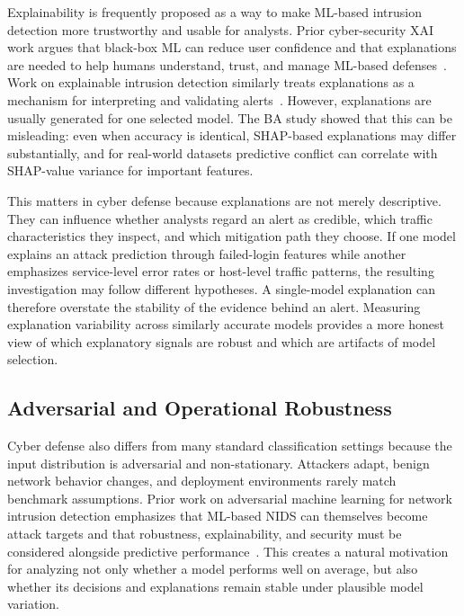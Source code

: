 Explainability is frequently proposed as a way to make ML-based intrusion detection more trustworthy and usable for analysts. Prior cyber-security XAI work argues that black-box ML can reduce user confidence and that explanations are needed to help humans understand, trust, and manage ML-based defenses~\cite{zhang2022explainable}. Work on explainable intrusion detection similarly treats explanations as a mechanism for interpreting and validating alerts~\cite{szczepanski2020achieving}. However, explanations are usually generated for one selected model. The BA study showed that this can be misleading: even when accuracy is identical, SHAP-based explanations may differ substantially, and for real-world datasets predictive conflict can correlate with SHAP-value variance for important features.

This matters in cyber defense because explanations are not merely descriptive. They can influence whether analysts regard an alert as credible, which traffic characteristics they inspect, and which mitigation path they choose. If one model explains an attack prediction through failed-login features while another emphasizes service-level error rates or host-level traffic patterns, the resulting investigation may follow different hypotheses. A single-model explanation can therefore overstate the stability of the evidence behind an alert. Measuring explanation variability across similarly accurate models provides a more honest view of which explanatory signals are robust and which are artifacts of model selection.

\subsection{Adversarial and Operational Robustness}

Cyber defense also differs from many standard classification settings because the input distribution is adversarial and non-stationary. Attackers adapt, benign network behavior changes, and deployment environments rarely match benchmark assumptions. Prior work on adversarial machine learning for network intrusion detection emphasizes that ML-based NIDS can themselves become attack targets and that robustness, explainability, and security must be considered alongside predictive performance~\cite{pawlicki2020defending,choras2020machine}. This creates a natural motivation for analyzing not only whether a model performs well on average, but also whether its decisions and explanations remain stable under plausible model variation.

